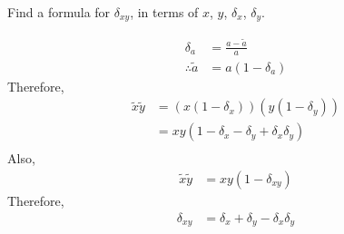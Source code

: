 \documentclass[fleqn, a4paper, 12pt, twoside]{article}
\theoremstyle{definition}
\theoremstyle{theorem}
\renewcommand{\tilde}{\widetilde}
\begin{document}
\begin{question}
	Find a formula for $\delta_{x y}$, in terms of $x$, $y$, $\delta_x$, $\delta_y$.
\end{question}

\begin{solution}
	\begin{align*}
		\delta_a             & = \frac{a - \tilde{a}}{a} \\
		\therefore \tilde{a} & = a (1 - \delta_a)
	\end{align*}
	Therefore,
	\begin{align*}
		\tilde{x} \tilde{y} & = \left( x (1 - \delta_x) \right) \left( y (1 - \delta_y) \right) \\
                                    & = x y (1 - \delta_x - \delta_y + \delta_x \delta_y)               \\
	\end{align*}
	Also,
	\begin{align*}
		\tilde{x} \tilde{y} & = x y (1 - \delta_{x y})
	\end{align*}
	Therefore,
	\begin{align*}
		\delta_{x y} & = \delta_x + \delta_y - \delta_x \delta_y
	\end{align*}
\end{solution}
\end{document}
